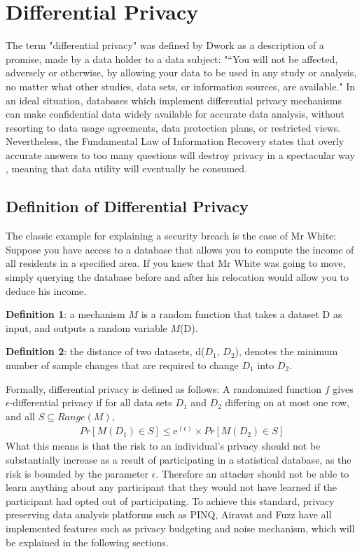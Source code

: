 \section{Differential Privacy}
The term "differential privacy" was defined by Dwork as a description of a promise, made by a data holder to a data subject: "“You will not be affected, adversely or otherwise, by allowing your data to be used in any study or analysis, no matter what other studies, data sets, or information sources, are available." \cite{dwork2013algorithmic}
In an ideal situation, databases which implement differential privacy mechanisms can make confidential data widely available for accurate data analysis, without resorting to data usage agreements, data protection plans, or restricted views. Nevertheless, the Fundamental Law of Information Recovery states that overly accurate answers to too many questions will destroy privacy in a spectacular way \cite{dwork2013algorithmic}, meaning that data utility will eventually be consumed.

\subsection{Definition of Differential Privacy}
The classic example for explaining a security breach is the case of Mr White: Suppose you have access to a database that allows you to compute the income of all residents in a specified area. If you knew that Mr White was going to move, simply querying the database before and after his relocation would allow you to deduce his income. 

\textbf{Definition 1}: a mechanism $M$ is a random function that takes a dataset D as input, and outputs a random variable $M$(D).

\textbf{Definition 2}: the distance of two datasets, d($D_1$, $D_2$), denotes the minimum number of sample changes that are required to change $D_1$ into $D_2$.

Formally, differential privacy is defined as follows:
A randomized function $f$ gives $\epsilon$-differential privacy if for all data sets $D_1$ and $D_2$ differing on at most one row, and all $S\subseteq Range(M)$,
\begin{eqnarray} \label{DiffPrivDef}
 Pr[M(D_1)\in S]\leq \mathrm{e}^{(\epsilon)}\times Pr[M(D_2)\in S]
 \end{eqnarray}
What this means is that the risk to an individual's privacy should not be substantially increase as a result of participating in a statistical database, as the risk is bounded by the parameter $\epsilon$. Therefore an attacker should not be able to learn anything about any participant that they would not have learned if the participant had opted out of participating. To achieve this standard, privacy preserving data analysis platforms such as PINQ\cite{mcsherry2009PINQ}, Airavat\cite{roy2010airavat} and Fuzz\cite{Haeberlen2011fuzz} have all implemented features such as privacy budgeting and noise mechanism, which will be explained in the following sections.  

